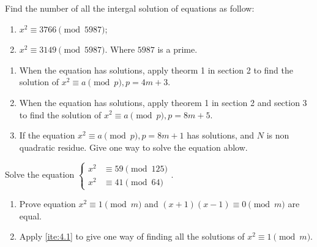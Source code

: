\documentclass{ctexart}
\newif\ifpreface
\begin{document}
\large
\setlength{\baselineskip}{1.2em}
\ifpreface

\else
{}
\begin{problem}\label{pro:1}
  Find the number of all the intergal solution of equations as follow:
  \begin{enumerate}
    \item \(x^2 \equiv 3766 \pmod{5987}\);
    \item \(x^2 \equiv 3149 \pmod{5987}\).
      Where \(5987\) is a prime.
  \end{enumerate}
\end{problem}
\begin{problem}\label{pro:2}
  \begin{enumerate}
    \item When the equation has solutions, apply theorm 1 in section 2 to
      find the solution of \(x^2 \equiv a \pmod{p}, p=4m + 3\).
    \item When the equation has solutions, apply theorem 1 in section 2 and section 3 to
      find the solution of \(x^2 \equiv a \pmod{p}, p=8m + 5\).
    \item If the equation \(x^2 \equiv a \pmod{p},p=8m + 1\) has solutions, and \(N \) is non quadratic residue.
      Give one way to solve the equation ablow.
  \end{enumerate}
\end{problem}
\begin{problem}\label{pro:3}
  Solve the equation \(\begin{cases}
    x^2 & \equiv 59 \pmod{125} \\
    x^2 & \equiv 41 \pmod{64}
  \end{cases}\).
\end{problem}
\begin{problem}\label{pro:4}
  \begin{enumerate}
    \item \label{ite:4.1} Prove equation \(x^2 \equiv 1 \pmod{m}\) and \((x + 1)(x-1) \equiv 0 \pmod{m}\) are equal.
    \item Apply \ref{ite:4.1} to give one way of finding all the solutions of \(x^2 \equiv 1 \pmod{m}\).
  \end{enumerate}
\end{problem}
\end{document}
